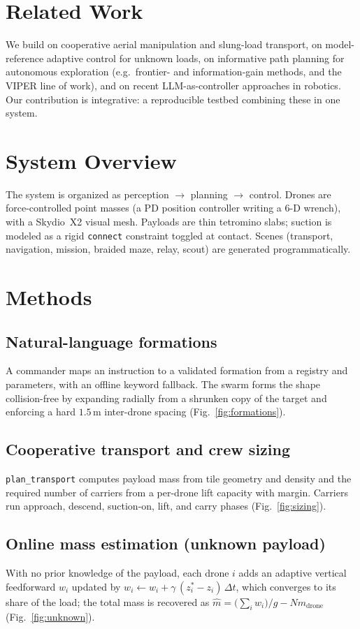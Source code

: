\documentclass[11pt]{article}
\begin{document}
\section{Related Work}
We build on cooperative aerial manipulation and slung-load transport, on
model-reference adaptive control for unknown loads, on informative path planning
for autonomous exploration (e.g.\ frontier- and information-gain methods, and the
VIPER line of work), and on recent LLM-as-controller approaches in robotics. Our
contribution is integrative: a reproducible testbed combining these in one system.

\section{System Overview}
The system is organized as perception $\rightarrow$ planning $\rightarrow$ control.
Drones are force-controlled point masses (a PD position controller writing a 6-D
wrench), with a Skydio~X2 visual mesh. Payloads are thin tetromino slabs; suction is
modeled as a rigid \texttt{connect} constraint toggled at contact. Scenes (transport,
navigation, mission, braided maze, relay, scout) are generated programmatically.

\section{Methods}
\subsection{Natural-language formations}
A commander maps an instruction to a validated formation from a registry and
parameters, with an offline keyword fallback. The swarm forms the shape
collision-free by expanding radially from a shrunken copy of the target and
enforcing a hard $1.5$\,m inter-drone spacing (Fig.~\ref{fig:formations}).

\subsection{Cooperative transport and crew sizing}
\texttt{plan\_transport} computes payload mass from tile geometry and density and
the required number of carriers from a per-drone lift capacity with margin. Carriers
run approach, descend, suction-on, lift, and carry phases (Fig.~\ref{fig:sizing}).

\subsection{Online mass estimation (unknown payload)}
With no prior knowledge of the payload, each drone $i$ adds an adaptive vertical
feedforward $w_i$ updated by $w_i \leftarrow w_i + \gamma\,(z^*_i - z_i)\,\Delta t$,
which converges to its share of the load; the total mass is recovered as
$\hat m = \big(\sum_i w_i\big)/g - N m_\text{drone}$ (Fig.~\ref{fig:unknown}).
\end{document}
